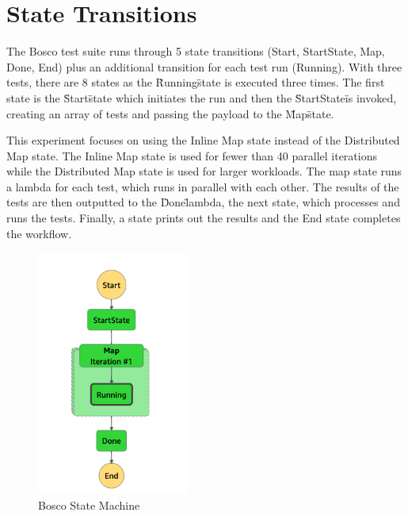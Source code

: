 \documentclass[12pt,a4paper,titlepage]{report}
\begin{document}
\section{State Transitions}

The Bosco test suite runs through 5 state transitions (Start, StartState, Map, Done, End) plus an additional transition for each test run (Running). With three tests, there are 8 states as the \"Running\" state is executed three times. The first state is the \"Start\" state which initiates the run and then the \"StartState\" is invoked, creating an array of tests and passing the payload to the \"Map\" state.

This experiment focuses on using the Inline Map state instead of the Distributed Map state. The Inline Map state is used for fewer than 40 parallel iterations while the Distributed Map state is used for larger workloads. The map state runs a lambda for each test, which runs in parallel with each other. The results of the tests are then outputted to the \"Done\" lambda, the next state, which processes and runs the tests. Finally, a state prints out the results and the End state completes the workflow.

\begin{figure}[h]
 \centering
 \includegraphics[width=5cm]{./diagrams/step_function}
 \caption{Bosco State Machine}
\end{figure}
\end{document}
